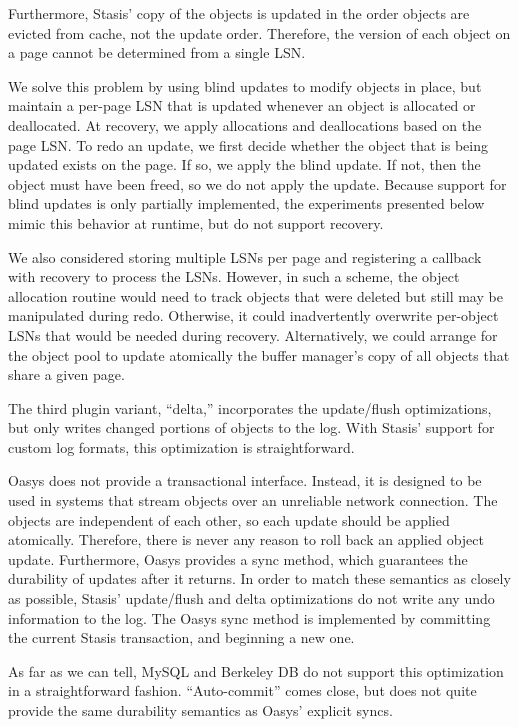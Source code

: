 \documentclass[letterpaper,twocolumn,10pt]{article}
\newcommand{\yad}{Stasis\xspace}
\newcommand{\yads}{Stasis'\xspace}
\newcommand{\oasys}{Oasys\xspace}
\newcommand{\eab}[1]{\textcolor{red}{\bf EAB: #1}}
\begin{document}
Furthermore, \yads copy of the objects is updated in the order objects
are evicted from cache, not the update order.
Therefore, the version of each object on a page cannot be determined
from a single LSN.

We solve this problem by using blind updates to modify
objects in place, but maintain a per-page LSN that is updated whenever
an object is allocated or deallocated.  At recovery, we apply
allocations and deallocations based on the page LSN.  To redo an
update, we first decide whether the object that is being updated
exists on the page.  If so, we apply the blind update.  If not, then
the object must have been freed, so we do not apply the
update. Because support for blind updates is only partially implemented, the
experiments presented below mimic this behavior at runtime, but do not
support recovery.

We also considered storing multiple LSNs per page and registering a
callback with recovery to process the LSNs.  However, in such a
scheme, the object allocation routine would need to track objects that
were deleted but still may be manipulated during redo.  Otherwise, it
could inadvertently overwrite per-object LSNs that would be needed
during recovery.
%
%
Alternatively, we could arrange for the object pool 
to update atomically the buffer 
manager's copy of all objects that share a given page.

The third plugin variant, ``delta,'' incorporates the update/flush
optimizations, but only writes changed portions of
objects to the log.  With \yads support for custom log
formats, this optimization is straightforward.

\oasys does not provide a transactional interface.
Instead, it is designed to be used in systems that stream objects over
an unreliable network connection.  The objects are independent of each
other, so each update should be applied atomically.  Therefore, there is
never any reason to roll back an applied object update.  Furthermore,
\oasys provides a sync method, which guarantees the durability of
updates after it returns.  In order to match these semantics as
closely as possible, \yads update/flush and delta optimizations do not
write any undo information to the log.  The \oasys sync method is
implemented by committing the current \yad transaction, and beginning
a new one.

As far as we can tell, MySQL and Berkeley DB do not support this
optimization in a straightforward fashion.  ``Auto-commit'' comes
close, but does not quite provide the same durability semantics as
\oasys' explicit syncs.
\end{document}
